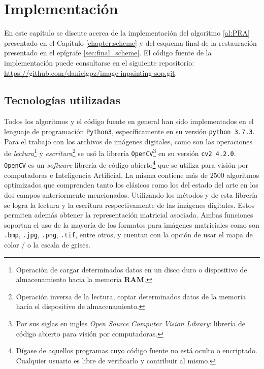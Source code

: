 \chapter{Implementaci\'on}\label{chapter:code}

En este capítulo se discute acerca de la implementación del algoritmo \ref{al:PRA} presentado en el Capítulo \ref{chapter:scheme} y del esquema final de la restauraci\'on presentado en el epígrafe \ref{sec:final_scheme}. El c\'odigo fuente de la implementaci\'on puede consultarse en el siguiente repositorio: \url{https://github.com/danielgpz/image-inpainting-sop.git}.

\section{Tecnolog\'ias utilizadas}
Todos los algoritmos y el c\'odigo fuente en general han sido implementados en el lenguaje de programaci\'on \texttt{Python3}, específicamente en su versi\'on \texttt{python 3.7.3}. Para el trabajo con los archivos de im\'agenes digitales, como son las operaciones de \textit{lectura}\footnote{Operaci\'on de cargar determinados datos en un disco duro o dispositivo de almacenamiento hacia la memoria \textbf{RAM}.} y \textit{escritura}\footnote{Operaci\'on inversa de la lectura, copiar determinados datos de la memoria hacia el dispositivo de almacenamiento.} se us\'o la librer\'ia \texttt{OpenCV}\footnote{Por sus siglas en ingles \textit{Open Source Computer Vision Library}: librer\'ia de c\'odigo abierto para visi\'on por computadoras.} en su versi\'on \texttt{cv2 4.2.0}. \texttt{OpenCV} es un \textit{software} librer\'ia de c\'odigo abierto\footnote{D\'igase de aquellos programas cuyo c\'odigo fuente no est\'a oculto o encriptado. Cualquier usuario es libre de verificarlo y contribuir al mismo.} que se utiliza para visi\'on por computadoras e Inteligencia Artificial. La misma contiene m\'as de $2500$ algoritmos optimizados que comprenden tanto los cl\'asicos como los del estado del arte en los dos campos anteriormente mencionados. Utilizando los m\'etodos  y  de esta librer\'ia se logra la lectura y la escritura respectivamente de las im\'agenes digitales. Estos permiten adem\'as obtener la representaci\'on matricial asociada. Ambas funciones soportan el uso de la mayor\'ia de los formatos para imágenes matriciales como son \texttt{.bmp}, \texttt{.jpg}, \texttt{.png}, \texttt{.tif}, entre otros, y cuentan con la opción de usar el mapa de color \RGB/ o la escala de grises.

